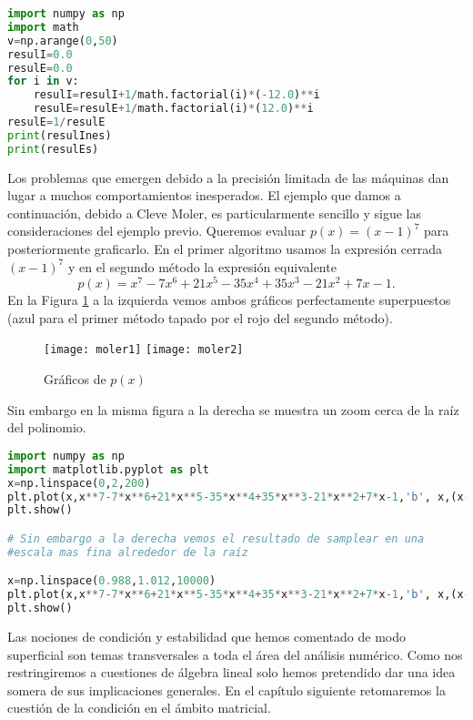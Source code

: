 \begin{Shaded}
\begin{lstlisting}[language=python]
import numpy as np
import math 
v=np.arange(0,50)
resulI=0.0 
resulE=0.0 
for i in v:
	resulI=resulI+1/math.factorial(i)*(-12.0)**i
	resulE=resulE+1/math.factorial(i)*(12.0)**i 
resulE=1/resulE 
print(resulInes)
print(resulEs)
\end{lstlisting}
\end{Shaded}
Los problemas que emergen debido a la precisión limitada de las máquinas dan lugar a muchos comportamientos inesperados. El ejemplo que damos a continuación, debido a Cleve Moler, es particularmente sencillo y sigue las consideraciones del ejemplo previo. Queremos evaluar $p(x)=(x-1)^7$ para posteriormente graficarlo.
En el primer algoritmo usamos la expresión cerrada $(x-1)^7$  y en el segundo método la expresión equivalente
$$
p(x)=x^7-7x^6+21x^5-35x^4+35x^3-21x^2+7x-1.
$$
En la Figura \ref{fig:moler} a la izquierda vemos ambos gráficos perfectamente superpuestos (azul para el primer método tapado por el rojo del segundo método).
\begin{figure}
 \texttt{[image: moler1]}
 \texttt{[image: moler2]}
 \caption{Gráficos de $p(x)$}
 \label{fig:moler}
 \end{figure}
Sin embargo en la misma figura a la derecha se muestra un zoom cerca de la raíz del polinomio.

\begin{Shaded}
\begin{lstlisting}[language=python]
import numpy as np
import matplotlib.pyplot as plt
x=np.linspace(0,2,200)
plt.plot(x,x**7-7*x**6+21*x**5-35*x**4+35*x**3-21*x**2+7*x-1,'b', x,(x-1)**7,'r')
plt.show()

# Sin embargo a la derecha vemos el resultado de samplear en una
#escala mas fina alrededor de la raíz

x=np.linspace(0.988,1.012,10000)
plt.plot(x,x**7-7*x**6+21*x**5-35*x**4+35*x**3-21*x**2+7*x-1,'b', x,(x-1)**7,'r')
plt.show()
\end{lstlisting}
\end{Shaded}


Las nociones de condición y estabilidad que hemos comentado de modo superficial son temas transversales a toda el área del análisis  numérico. Como nos restringiremos a cuestiones de álgebra lineal solo hemos pretendido dar una idea somera de sus implicaciones generales. En el capítulo siguiente retomaremos la cuestión de la condición en el ámbito matricial.

